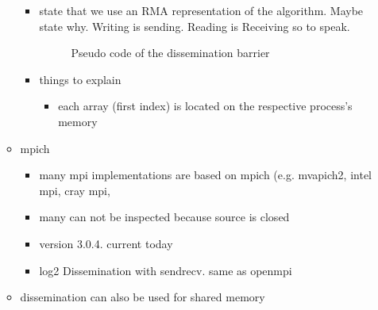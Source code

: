 \documentclass[a4paper, 10pt]{article}
\begin{document}
\begin{enumerate}
\begin{itemize}
\begin{itemize}
			\item state that we use an RMA representation of the algorithm. Maybe state why. Writing is sending. Reading is Receiving so to speak.
				\begin{figure}[htbp]
					\centering
					
					\caption{Pseudo code of the dissemination barrier}
					\label{fig:dissemination-no-reset}
				\end{figure}
			\item things to explain
				\begin{itemize}
					\item each array (first index) is located on the respective process's memory
				\end{itemize}

		\end{itemize}
	\item mpich
		\begin{itemize}
			\item many mpi implementations are based on mpich (e.g. mvapich2, intel mpi, cray mpi,
			\item many can not be inspected because source is closed
			\item version 3.0.4. current today
			\item log2 Dissemination with sendrecv. same as openmpi
		\end{itemize}
	\item dissemination can also be used for shared memory\cite{hoefler2013}
\end{itemize}


\end{enumerate}
\end{document}
